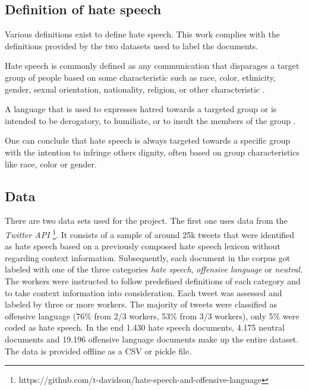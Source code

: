 \subsection{Definition of hate speech} 
\label{ch:approachA}

Various definitions exist to define hate speech. This work complies with the definitions provided by the two datasets used to label the documents. 

\begin{defStrich}
	Hate speech is commonly defined as any com\-mu\-ni\-ca\-ti\-on that disparages a target group of people based on some characteristic such as race, color, ethnicity, gender, sexual orientation, nationality, religion, or other characteristic \cite{DeGibert2020}.
\end{defStrich}

\begin{defStrich}
	A language that is used to expresses hatred towards a targeted group or is intended to be derogatory, to humiliate, or to insult the members of the group \cite{ThomasDavidson2020}.
\end{defStrich}

One can conclude that hate speech is always targeted towards a specific group with the intention to infringe others dignity, often based on group characteristics like race, color or gender. 

\subsection{Data}
\label{ch:approachB}

There are two data sets used for the project. The first one uses data from the \textit{Twitter API} \cite{ThomasDavidson2020}\footnote{https://github.com/t-davidson/hate-speech-and-offensive-language}. It consists of a sample of around 25k tweets that were identified as hate speech based on a previously composed hate speech lexicon without regarding context information. Subsequently, each document in the corpus got labeled with one of the three categories \textit{hate speech}, \textit{offensive language} or \textit{neutral}. The workers were instructed to follow predefined definitions of each category and to take context information into consideration. Each tweet was assessed and labeled by three or more workers. The majority of tweets were classified as offensive language (76\% from 2/3 workers, 53\% from 3/3 workers), only 5\% were coded as hate speech. In the end 1.430 hate speech documents, 4.175 neutral documents and 19.196 offensive language documents make up the entire dataset. The data is provided offline as a CSV or pickle file. 

